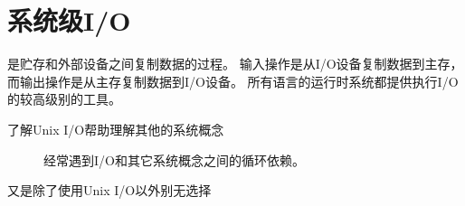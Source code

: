 
\chapter{系统级I/O}
{
    是贮存和外部设备之间复制数据的过程。
    输入操作是从I/O设备复制数据到主存，而输出操作是从主存复制数据到I/O设备。
    所有语言的运行时系统都提供执行I/O的较高级别的工具。

    \begin{description}
        \item[了解Unix I/O帮助理解其他的系统概念] 经常遇到I/O和其它系统概念之间的循环依赖。
        \item[又是除了使用Unix I/O以外别无选择]
    \end{description}

    
    
}

\cleardoublepage

\endinput
